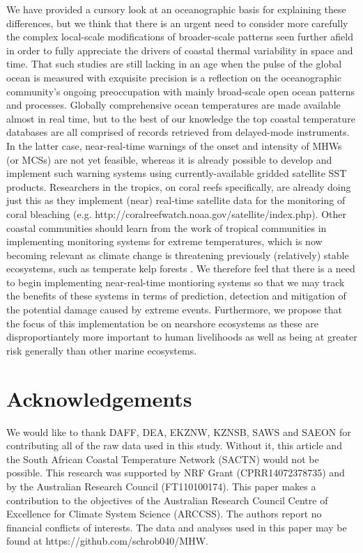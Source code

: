\documentclass[a4paper,10pt,review]{elsarticle}
\begin{document}
We have provided a cursory look at an oceanographic basis for explaining these differences, but we think that there is an urgent need to consider more carefully the complex local-scale modifications of broader-scale patterns seen further afield in order to fully appreciate the drivers of coastal thermal variability in space and time. That such studies are still lacking in an age when the pulse of the global ocean is measured with exquisite precision is a reflection on the oceanographic community's ongoing preoccupation with mainly broad-scale open ocean patterns and processes. Globally comprehensive ocean temperatures are made available almost in real time, but to the best of our knowledge the top coastal temperature databases are all comprised of records retrieved from delayed-mode instruments. In the latter case, near-real-time warnings of the onset and intensity of MHWs (or MCSs) are not yet feasible, whereas it is already possible to develop and implement such warning systems using currently-available gridded satellite SST products. Researchers in the tropics, on coral reefs specifically, are already doing just this as they implement (near) real-time satellite data for the monitoring of coral bleaching (e.g. http://coralreefwatch.noaa.gov/satellite/index.php). Other coastal communities should learn from the work of tropical communities in implementing monitoring systems for extreme temperatures, which is now becoming relevant as climate change is threatening previously (relatively) stable ecosystems, such as temperate kelp forests \citep{Wernberg2016}. We therefore feel that there is a need to begin implementing near-real-time montioring systems so that we may track the benefits of these systems in terms of prediction, detection and mitigation of the potential damage caused by extreme events. Furthermore, we propose that the focus of this implementation be on nearshore ecosystems as these are disproportiantely more important to human livelihoods as well as being at greater risk generally than other marine ecosystems.

\section*{Acknowledgements}
We would like to thank DAFF, DEA, EKZNW, KZNSB, SAWS and SAEON for contributing all of the raw data used in this study. Without it, this article and the South African Coastal Temperature Network (SACTN) would not be possible. This research was supported by NRF Grant (CPRR14072378735) and by the Australian Research Council (FT110100174). This paper makes a contribution to the objectives of the Australian Research Council Centre of Excellence for Climate System Science (ARCCSS). The authors report no financial conflicts of interests. The data and analyses used in this paper may be found at https://github.com/schrob040/MHW.
\end{document}
